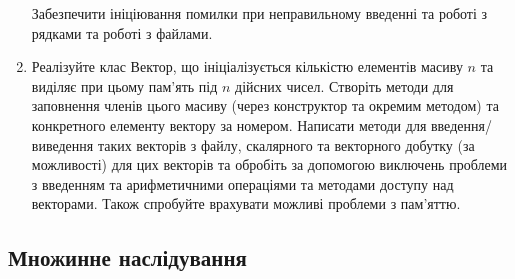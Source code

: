 \documentclass[]{article}
\begin{document}
\begin{enumerate}
  Забезпечити ініціювання помилки при неправильному введенні та роботі з
  рядками та роботі з файлами.
\item
  Реалізуйте клас Вектор, що ініціалізується кількістю елементів масиву
  \(n\) та виділяє при цьому пам'ять під \(n\) дійсних чисел. Створіть
  методи для заповнення членів цього масиву (через конструктор та
  окремим методом) та конкретного елементу вектору за номером. Написати
  методи для введення/виведення таких векторів з файлу, скалярного та
  векторного добутку (за можливості) для цих векторів та обробіть за
  допомогою виключень проблеми з введенням та арифметичними операціями
  та методами доступу над векторами. Також спробуйте врахувати можливі
  проблеми з пам'яттю.
\end{enumerate}

\subsection{Множинне наслідування}
\end{document}
